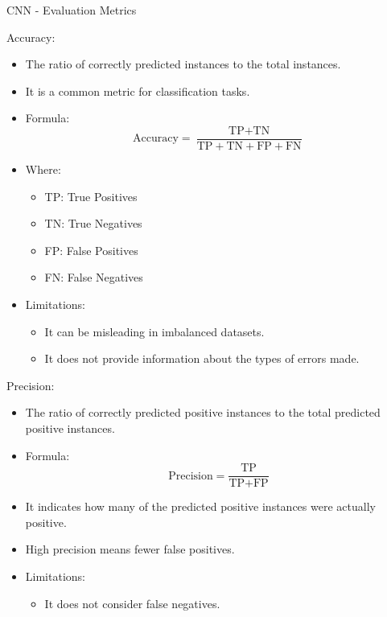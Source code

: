 \begin{frame}{CNN - Evaluation Metrics}
\begin{block}{Accuracy:}
    \begin{itemize}
        \item The ratio of correctly predicted instances to the total instances.
        \item It is a common metric for classification tasks.
        \item Formula: 
            \[
            \text{Accuracy} = \frac{\text{TP} + \text{TN}}{\text{TP} + \text{TN} + \text{FP} + \text{FN}}
            \]
        \item Where:
            \begin{itemize}
                \item TP: True Positives
                \item TN: True Negatives
                \item FP: False Positives
                \item FN: False Negatives
            \end{itemize}
        \item Limitations:
            \begin{itemize}
                \item It can be misleading in imbalanced datasets.
                \item It does not provide information about the types of errors made.
            \end{itemize}
    \end{itemize}
\end{block}
\framebreak
\begin{block}{Precision:}
    \begin{itemize}
        \item The ratio of correctly predicted positive instances to the total predicted positive instances.
        \item Formula: 
            \[
            \text{Precision} = \frac{\text{TP}}{\text{TP} + \text{FP}}
            \]
        \item It indicates how many of the predicted positive instances were actually positive.
        \item High precision means fewer false positives.
        \item Limitations:
            \begin{itemize}
                \item It does not consider false negatives.

\end{itemize}
\end{itemize}
\end{block}
\end{frame}
